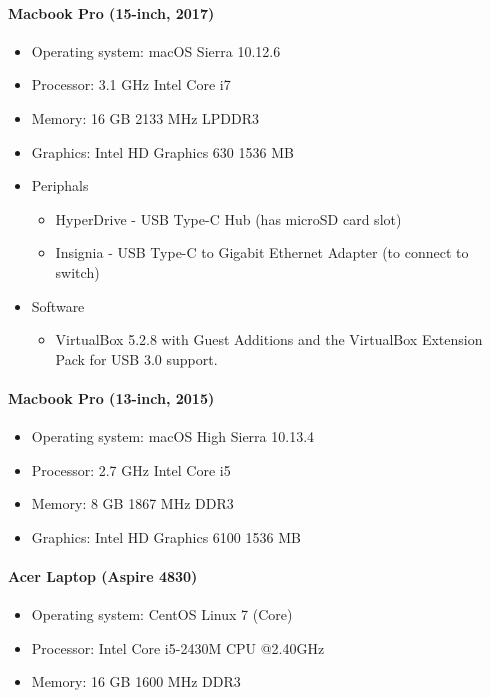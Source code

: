 \paragraph{Macbook Pro (15-inch, 2017)}
\begin{itemize}
        \item Operating system: macOS Sierra 10.12.6 
        \item Processor: 3.1 GHz Intel Core i7
        \item Memory: 16 GB 2133 MHz LPDDR3
        \item Graphics: Intel HD Graphics 630 1536 MB
        \item Periphals
        \begin{itemize}
                \item HyperDrive - USB Type-C Hub (has microSD card slot)
                \item Insignia - USB Type-C to Gigabit Ethernet
                Adapter (to connect to switch)
        \end{itemize}
        \item Software
        \begin{itemize}
                \item VirtualBox 5.2.8 with Guest Additions and the
                VirtualBox Extension Pack for USB 3.0 support.
        \end{itemize}
\end{itemize}

\paragraph{Macbook Pro (13-inch, 2015)}
\begin{itemize}
	\item Operating system: macOS High Sierra 10.13.4 
	\item Processor: 2.7 GHz Intel Core i5
	\item Memory: 8 GB 1867 MHz DDR3
	\item Graphics: Intel HD Graphics 6100 1536 MB
\end{itemize}

\paragraph{Acer Laptop (Aspire 4830)}
\begin{itemize}
	\item Operating system: CentOS Linux 7 (Core)
	\item Processor: Intel Core i5-2430M CPU @2.40GHz
	\item Memory: 16 GB 1600 MHz DDR3
\end{itemize}

